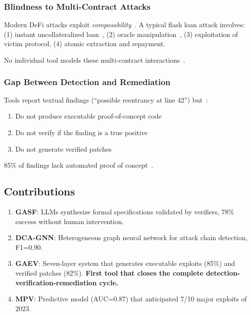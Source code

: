 \documentclass[11pt]{article}
\theoremstyle{definition}
\theoremstyle{plain}
\theoremstyle{remark}
\begin{document}
\subsubsection{Blindness to Multi-Contract Attacks}

Modern DeFi attacks exploit \textit{composability}~\cite{zhou2023sok}. A typical flash loan attack involves: (1) instant uncollateralized loan~\cite{qin2021attacking}, (2) oracle manipulation~\cite{eskandari2021sok}, (3) exploitation of victim protocol, (4) atomic extraction and repayment.

No individual tool models these multi-contract interactions~\cite{chen2020survey}.

\subsubsection{Gap Between Detection and Remediation}

Tools report textual findings (``possible reentrancy at line 42'') but~\cite{zhang2023demystifying}:
\begin{enumerate}
    \item Do not produce executable proof-of-concept code
    \item Do not verify if the finding is a true positive
    \item Do not generate verified patches
\end{enumerate}

85\% of findings lack automated proof of concept~\cite{chen2021defiranger}.

\subsection{Contributions}

\begin{enumerate}[label=\textbf{C\arabic*:}]
    \item \textbf{GASF}: LLMs synthesize formal specifications validated by verifiers, 78\% success without human intervention.
    
    \item \textbf{DCA-GNN}: Heterogeneous graph neural network for attack chain detection, F1=0.90.
    
    \item \textbf{GAEV}: Seven-layer system that generates executable exploits (85\%) and verified patches (82\%). \textbf{First tool that closes the complete detection-verification-remediation cycle.}
    
    \item \textbf{MPV}: Predictive model (AUC=0.87) that anticipated 7/10 major exploits of 2023.
\end{enumerate}
\end{document}
